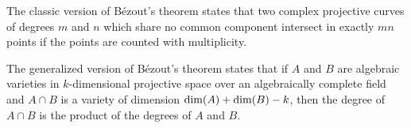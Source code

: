 \documentclass[12pt]{article}
\begin{document}
The classic version of B\'ezout's theorem states that two complex projective curves of degrees $m$ and $n$ which share no common component intersect in exactly $mn$ points if the points are counted with multiplicity.

The generalized version of B\'ezout's theorem states that if $A$ and $B$ are algebraic varieties in $k$-dimensional projective space over an algebraically complete field and $A \cap B$ is a variety of dimension ${\rm dim} (A) + {\rm dim}(B) - k$, then the degree of $A \cap B$ is the product of the degrees of $A$ and $B$.
\end{document}

